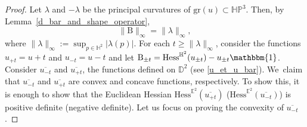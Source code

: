 \documentclass[JEP,XML,SOM,Unicode,NoEqCountersInSection, NoFloatCountersInSection,published]{cedram}
\theoremstyle{plain}
\theoremstyle{definition}
\newcommand{\HP}{\mathbb{HP}^3}
\newcommand{\hess}{\mathrm{Hess}^{\mathbb{H}^2}}
\newcommand{\B}{\mathrm{B}}
\begin{document}
\begin{proof}
Let \(\lambda\) and \(-\lambda\) be the principal curvatures of \(\mathrm{gr}(u) \subset \HP\). Then, by Lem\-ma~\ref{d_bar_and_shape_operator},
\[
\lVert \B \rVert_{\infty} = \lVert \lambda \rVert_{\infty},
\]
where \(\lVert \lambda \rVert_{\infty} := \sup_{p \in \mathbb{H}^2} \lvert \lambda(p) \rvert.\)
For each \(t \geq \lVert \lambda \rVert_{\infty} \), consider the functions \(u_{{+t}} = u + t \) and \(u_{{-t}} = u - t \) and let \(\B_{\pm t} = \hess(u_{\pm t}) - u_{\pm t} \mathbbm{1} \). Consider \(\overline{u_{{-t}}} \) and \(\overline{u_{{+t}}} \), the functions defined on \(\mathbb{D}^2 \) (see \eqref{u_et_u_bar}). We~claim that \(\overline{u_{{-t}}} \) and \(\overline{u_{{+t}}} \) are convex and concave functions, respectively. To show this, it is enough to show that the Euclidean Hessian \(\mathrm{Hess}^{\mathbb{E}^2}(\overline{u_{{+t}}}) \) (\resp \(\mathrm{Hess}^{\mathbb{E}^2}(\overline{u_{{-t}}}) \)) is positive definite (\resp negative definite). Let us focus on proving the convexity of \(\overline{u_{{-t}}} \).


\end{proof}
\end{document}
